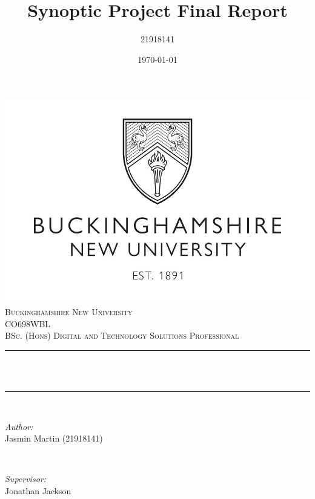 \documentclass{article}
\title{Synoptic Project Final Report}	%
\author{21918141}		%
\date{\today}			%
\makeatletter
\let\thetitle\@title
\let\thedate\@date
\makeatother
\begin{document}
\begin{titlepage}
  \centering
  \vspace*{0.5 cm}
  \includegraphics[scale = 0.15]{images/bucks-logo.jpeg}\\[1.0 cm]	   %
  \textsc{\LARGE Buckinghamshire New University}\\[2.0 cm]	   %
  \textsc{\Large CO698WBL }\\[0.5 cm] %
  \textsc{\large BSc. (Hons) Digital and Technology Solutions Professional}\\[0.5 cm]			%
  \rule{\linewidth}{0.2 mm} \\[0.4 cm]
       { \huge \bfseries \thetitle}\\
       \rule{\linewidth}{0.2 mm} \\[1.5 cm]

       \begin{minipage}{0.4\textwidth}
	 \begin{flushleft} \large
	   \emph{Author:}\\
           Jasmin Martin (21918141)    %
	 \end{flushleft}
       \end{minipage}~
       \begin{minipage}{0.4\textwidth}
	 \begin{flushright} \large
	   \emph{Supervisor:} \\
           Jonathan Jackson     %
	 \end{flushright}
       \end{minipage}\\[2 cm] 

       {\large \thedate}\\[2 cm]

       \vfill

\end{titlepage}
\end{document}
